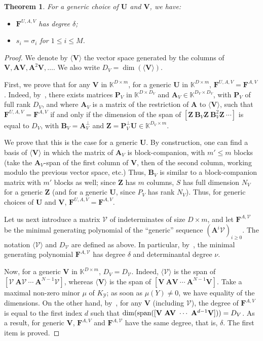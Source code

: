 \documentclass[12pt]{article}
\def\K {\ensuremath{\mathbb{K}}}
\def\scrV {\ensuremath{\mathscr{V}}}
\newtheorem{theorem}[definition]{Theorem}
\def\K{\mathbb{K}}
\def\scrY{\mathscr{Y}}
\def\mA{\mathbf{A}}
\def\mB{\mathbf{B}}
\def\mF{\mathbf{F}}
\def\mU{\mathbf{U}}
\def\mV{\mathbf{V}}
\def\mZ{\mathbf{Z}}
\begin{document}
\begin{theorem}
	\label{randXY}
	For a generic choice of $\mU$ and $\mV$, we have:
	\begin{itemize}
		\item $\mF^{U,A,V}$ has degree $\delta$;
		\item $s_i = \sigma_i$ for $1 \le i \le M$.
	\end{itemize}
\end{theorem}

\begin{proof}
	We denote by $\langle \mV \rangle$ the vector
	space generated by the columns of $\mV,\mA\mV,\mA^2\mV,\dots$. We also write
	$D_V=\dim(\langle \mV \rangle)$.
	
	First, we prove that for any $\mV$ in $\K^{D \times m}$, for a generic
	$\mU$ in $\K^{D\times m}$, $\mF^{U,A,V}=\mF^{A,V}$.  Indeed,
	by~\cite[Lemma~4.2]{Villard97a}, there exists matrices $\mathbf{P}_V$ in
	$\K^{D\times D_V}$ and $\mA_V \in \K^{D_V \times D_V}$, with $\mathbf{P}_V$ of
	full rank $D_V$, and where $\mA_V$ is a matrix of the restriction of $\mA$
	to $\langle \mV \rangle$, such that $\mF^{U,A,V}=\mF^{A,V}$ if and only if
	the dimension of the span of $[\mZ ~ \mB_V \mZ ~\mB_V^2 \mZ ~ \cdots]$ is equal to
	$D_V$, with $\mB_V=\mA_V^\perp$ and $\mZ=\mathbf{P}_V^\perp \mU \in \K^{D_V \times m}$.
	
	We prove that this is the case for a generic $\mU$. By construction, one
	can find a basis of $\langle \mV \rangle$ in which the matrix of $\mA_V$
	is block-companion, with $m' \le m$ blocks (take the $\mA_V$-span of the
	first column of $\mV$, then of the second column, working modulo the
	previous vector space, etc.) Thus, $\mB_V$ is similar to a
	block-companion matrix with $m'$ blocks as well; since $\mZ$ has $m$
	columns, $S$ has full dimension $N_V$ for a generic $\mZ$ (and for a
	generic $\mU$, since $P_V$ has rank $N_V$). Thus, for generic choices of
	$\mU$ and $\mV$, $\mF^{U,A,V}=\mF^{A,V}$.
	
	Let us next introduce a matrix $\scrV$ of indeterminates of size $D
	\times m$, and let $\mF^{A,\scrV}$ be the minimal generating polynomial
	of the ``generic'' sequence $(\mA^i \scrV)_{i \ge 0}$. The notation
	$\langle \scrV \rangle$ and $D_\scrV$ are defined as above.  In
	particular, by~\cite[Proposition 6.1]{Villard97a}, the minimal
	generating polynomial $\mF^{A,\scrV}$ has degree $\delta$ and
	determinantal degree $\nu$.
	
	Now, for a generic $\mV$ in $\K^{D\times m}$, $D_V=D_\scrV$. Indeed,
	$\langle \scrV\rangle$ is the span of $[\scrV ~ \mA \scrV ~ \cdots ~
	\mA^{N-1} \scrV]$, whereas $\langle \mV \rangle$ is the span of $[\mV ~ \mA \mV
	~ \cdots ~\mA^{N-1} \mV]$. Take a maximal non-zero minor $\mu$ of
	$K_\scrY$; as soon as $\mu(Y)\ne 0$, we have equality of the
	dimensions. On the other hand, by~\cite[Lemma~4.3]{Villard97a}, for
	any $\mV$ (including $\scrV$), the degree of $\mF^{A,V}$ is equal to the
	first index $d$ such that $\dim({\rm span}([\mV ~ \mA \mV ~ \cdots ~\mA^{d-1}
	\mV]))=D_V$. As a result, for generic $\mV$, $\mF^{A,V}$ and $\mF^{A,\scrV}$
	have the same degree, that is, $\delta$.  The first item is proved.
	

\end{proof}
\end{document}
